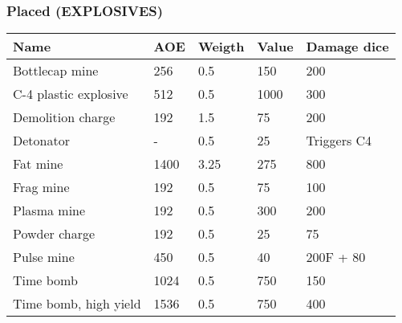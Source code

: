 
\subsubsection{Placed (EXPLOSIVES)}
\begin{longtable}{|p{4cm}|p{1.5cm}|p{1.5cm}|p{2cm}|p{4cm}|}
\hline
\bfseries Name & \bfseries AOE & \bfseries Weigth & \bfseries Value & \bfseries Damage dice \\
\hline
\endhead
Bottlecap mine & 256 & 0.5 & 150 & 200 \\
C-4 plastic explosive & 512 & 0.5 & 1000 & 300 \\
Demolition charge & 192 & 1.5 & 75 & 200 \\
Detonator & - & 0.5 & 25 & Triggers C4 \\
Fat mine & 1400 & 3.25 & 275 & 800 \\
Frag mine & 192 & 0.5 & 75 & 100 \\
Plasma mine & 192 & 0.5 & 300 & 200 \\
Powder charge & 192 & 0.5 & 25 & 75 \\
Pulse mine & 450 & 0.5 & 40 & 200F + 80 \\
Time bomb & 1024 & 0.5 & 750 & 150 \\
Time bomb, high yield & 1536 & 0.5 & 750 & 400 \\
\hline
\end{longtable}
